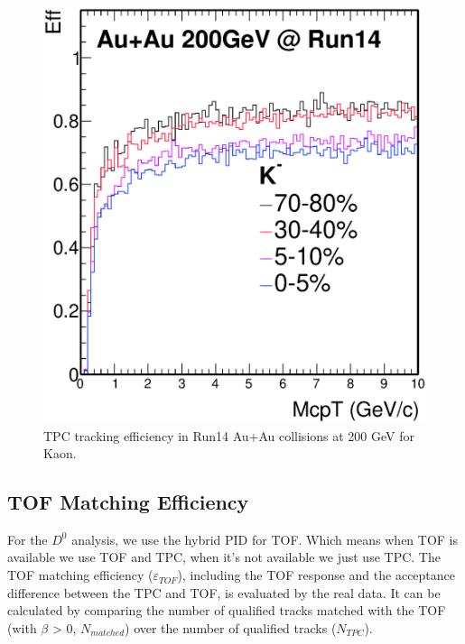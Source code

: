 \begin{figure}[htbp]
\begin{minipage}[htbp]{0.52\linewidth}
\includegraphics[width=1.0\textwidth]{figure/Run14_D0HFT/kaon.eps} 
\caption{TPC tracking efficiency in Run14 Au+Au collisions at 200 GeV for Kaon. \label{fig:mkaon}}
\end{minipage}
\end{figure}

\subsection{TOF Matching Efficiency \label{sec:TOFmatch}}

For the $D^0$ analysis, we use the hybrid PID for TOF. Which means when TOF is available we use TOF and TPC, when it's not available we just use TPC. The TOF matching efficiency ($\varepsilon_{TOF}$), including the TOF response and the acceptance difference between the TPC and TOF, is evaluated by the real data. It can be calculated by comparing the number of qualified tracks matched with the TOF (with $\beta$ > 0, $N_{matched}$) over  the number of qualified tracks ($N_{TPC}$).

